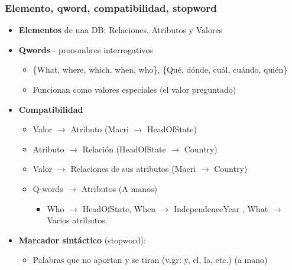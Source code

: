 \fontsize{9.5pt}{7.2}\selectfont
\begin{frame}[<+->]
  \frametitle{Elemento, qword, compatibilidad, stopword}
   \begin{itemize}
      \item \textbf{Elementos} de una DB: Relaciones, Atributos y Valores
      \item \textbf{Qwords} - pronombres interrogativos
      \begin{itemize}
        \item \{What, where, which, when, who\}, \{Qué, dónde, cuál, cuándo, quién\}
        \item Funcionan como valores especiales (el valor preguntado)
      \end{itemize}
      \item \textbf{Compatibilidad}
      \begin{itemize}
          \item Valor $\rightarrow$ Atributo (Macri $\rightarrow$ HeadOfState)
          \item Atributo  $\rightarrow$  Relación (HeadOfState $\rightarrow$ Country)
          \item Valor $\rightarrow$ Relaciones de sus atributos (Macri $\rightarrow$ Country)
          \item {\color{blue}Q-words $\rightarrow$ Atributos} (A manos)
          \begin{itemize}
            \item Who $\rightarrow$ HeadOfState, When $\rightarrow$ IndependenceYear , What $\rightarrow$ Varios atributos.
          \end{itemize}
      \end{itemize}
        \item \textbf{Marcador sintáctico} (stopword):
      \begin{itemize}
        \item Palabras que no aportan y se tiran (v.gr: y, el, la, etc.) (a mano)
      \end{itemize}
    \end{itemize}
\end{frame}

